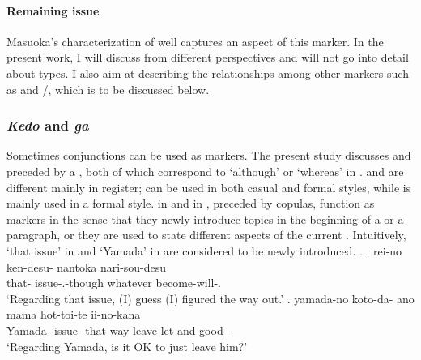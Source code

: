 


\paragraph{Remaining issue}

Masuoka's characterization of  well captures
an aspect of this marker.
In the present work, I will discuss  from different perspectives
and will not go into detail about  types.
I also aim at describing the relationships among other  markers
such as  and /,
which is to be discussed below.



\subsubsection{\textit{Kedo} and \textit{ga}}\label{BackSubSubKedo}

Sometimes conjunctions can be used as  markers.
The present study discusses  and  preceded by a ,
both of which correspond to `although' or `whereas' in .
 and  are different mainly in register;
 can be used in both casual and formal styles,
while  is mainly used in a formal style.
 in \Next[a] and  in \Next[b],
preceded by copulas,
function as  markers in the sense that
they newly introduce topics in the beginning of a  or a paragraph, or
they are used to state different aspects of the current 
\cite{koide84,takahashi99}.
Intuitively,
`that issue' in \Next[a] and `Yamada' in \Next[b]
are considered to be newly introduced.
%
\ex.
 \ag. rei-no ken-desu- nantoka nari-sou-desu \\
      that- issue-.-though whatever become-will-. \\
      `Regarding that issue, (I) guess (I) figured the way out.'
 \bg. yamada-no koto-da- ano mama hot-toi-te ii-no-kana \\
      Yamada- issue- that way leave-let-and good-- \\
      `Regarding Yamada, is it OK to just leave him?'
      \hfill{\cite[283]{niwa06}}


